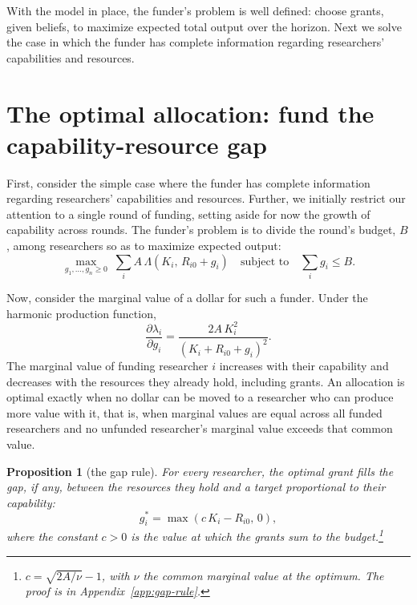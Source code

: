 \documentclass[article, 11pt, reqno]{amsart}
\newtheorem{prop}{Proposition}
\theoremstyle{named}
\begin{document}
With the model in place, the funder's problem is well defined: choose grants, given beliefs, to maximize expected total output over the horizon. Next we solve the case in which the funder has complete information regarding researchers' capabilities and resources.


\section{The optimal allocation: fund the capability-resource gap}\label{sec:optimal}

First, consider the simple case where the funder has complete information regarding researchers' capabilities and resources. Further, we initially restrict our attention to a single round of funding, setting aside for now the growth of capability across rounds. The funder's problem is to divide the round's budget, $B$, among researchers so as to maximize expected output:
\[
\max_{g_1, \ldots, g_n \geq 0} \; \sum_{i} A\,\Lambda(K_i,\, R_{i0} + g_i) \quad \text{subject to} \quad \sum_{i} g_i \leq B.
\]

Now, consider the marginal value of a dollar for such a funder. Under the harmonic production function,
\[
\frac{\partial \lambda_i}{\partial g_i} = \frac{2A\,K_i^2}{(K_i + R_{i0} + g_i)^2}.
\]
The marginal value of funding researcher $i$ increases with their capability and decreases with the resources they already hold, including grants. An allocation is optimal exactly when no dollar can be moved to a researcher who can produce more value with it, that is, when marginal values are equal across all funded researchers and no unfunded researcher's marginal value exceeds that common value.

\begin{prop}[the gap rule]\label{prop:gap-rule}
For every researcher, the optimal grant fills the gap, if any, between the resources they hold and a target proportional to their capability:
\[
g_i^* = \max(c\,K_i - R_{i0},\, 0),
\]
where the constant $c > 0$ is the value at which the grants sum to the budget.\footnote{$c = \sqrt{2A/\nu} - 1$, with $\nu$ the common marginal value at the optimum. The proof is in Appendix~\ref{app:gap-rule}.}
\end{prop}
\end{document}
